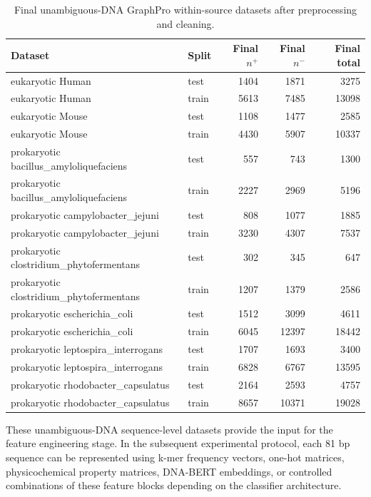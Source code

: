\begin{table}[htbp]
\centering
\small
\caption{Final unambiguous-DNA GraphPro within-source datasets after preprocessing and cleaning.}
\label{tab:graphpro-within-source-final}
\begin{tabular}{p{}lrrr}
\hline
Dataset & Split & Final $n^{+}$ & Final $n^{-}$ & Final total \\
\hline
eukaryotic Human & test & 1404 & 1871 & 3275 \\
eukaryotic Human & train & 5613 & 7485 & 13098 \\
eukaryotic Mouse & test & 1108 & 1477 & 2585 \\
eukaryotic Mouse & train & 4430 & 5907 & 10337 \\
prokaryotic bacillus\_amyloliquefaciens & test & 557 & 743 & 1300 \\
prokaryotic bacillus\_amyloliquefaciens & train & 2227 & 2969 & 5196 \\
prokaryotic campylobacter\_jejuni & test & 808 & 1077 & 1885 \\
prokaryotic campylobacter\_jejuni & train & 3230 & 4307 & 7537 \\
prokaryotic clostridium\_phytofermentans & test & 302 & 345 & 647 \\
prokaryotic clostridium\_phytofermentans & train & 1207 & 1379 & 2586 \\
prokaryotic escherichia\_coli & test & 1512 & 3099 & 4611 \\
prokaryotic escherichia\_coli & train & 6045 & 12397 & 18442 \\
prokaryotic leptospira\_interrogans & test & 1707 & 1693 & 3400 \\
prokaryotic leptospira\_interrogans & train & 6828 & 6767 & 13595 \\
prokaryotic rhodobacter\_capsulatus & test & 2164 & 2593 & 4757 \\
prokaryotic rhodobacter\_capsulatus & train & 8657 & 10371 & 19028 \\
\hline
\end{tabular}
\end{table}

These unambiguous-DNA sequence-level datasets provide the input for the feature
engineering stage. In the subsequent experimental protocol, each 81 bp sequence
can be represented using k-mer frequency vectors, one-hot matrices,
physicochemical property matrices, DNA-BERT embeddings, or controlled
combinations of these feature blocks depending on the classifier architecture.
